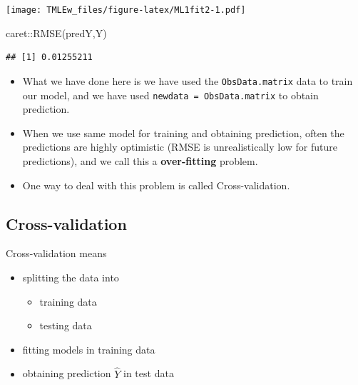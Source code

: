 \documentclass[
]{book}
\newenvironment{Shaded}{\begin{snugshade}}{\end{snugshade}}
\newcommand{\FunctionTok}[1]{\textcolor[rgb]{0.00,0.00,0.00}{#1}}
\newcommand{\NormalTok}[1]{#1}
\newcommand{\SpecialCharTok}[1]{\textcolor[rgb]{0.00,0.00,0.00}{#1}}
\providecommand{\tightlist}{%
  \setlength{\itemsep}{0pt}\setlength{\parskip}{0pt}}
\begin{document}
\texttt{[image: TMLEw\_files/figure-latex/ML1fit2-1.pdf]}

\begin{Shaded}
\begin{Highlighting}[]
\NormalTok{caret}\SpecialCharTok{::}\FunctionTok{RMSE}\NormalTok{(predY,Y)}
\end{Highlighting}
\end{Shaded}

\begin{verbatim}
## [1] 0.01255211
\end{verbatim}

\begin{itemize}
\tightlist
\item
  What we have done here is we have used the \texttt{ObsData.matrix} data to train our model, and we have used \texttt{newdata\ =\ ObsData.matrix} to obtain prediction.
\item
  When we use same model for training and obtaining prediction, often the predictions are highly optimistic (RMSE is unrealistically low for future predictions), and we call this a \textbf{over-fitting} problem.
\item
  One way to deal with this problem is called Cross-validation.
\end{itemize}

\hypertarget{cross-validation}{%
\subsection{Cross-validation}\label{cross-validation}}

Cross-validation means

\begin{itemize}
\tightlist
\item
  splitting the data into

  \begin{itemize}
  \tightlist
  \item
    training data
  \item
    testing data
  \end{itemize}
\item
  fitting models in training data
\item
  obtaining prediction \(\hat{Y}\) in test data
\end{itemize}
\end{document}
